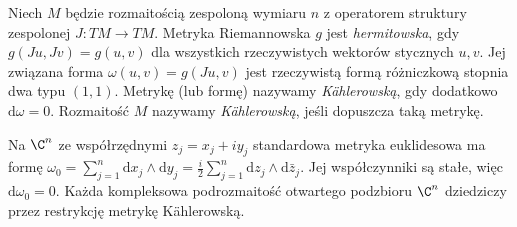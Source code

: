 \begin{definicja}
Niech $M$ będzie rozmaitością zespoloną wymiaru $n$
z operatorem struktury zespolonej $J:TM\to TM$.
Metryka Riemannowska $g$ jest \emph{hermitowska}, gdy
$g(Ju,Jv)=g(u,v)$ dla wszystkich rzeczywistych
wektorów stycznych $u,v$. Jej związana forma
$\omega(u,v)=g(Ju,v)$ jest rzeczywistą formą różniczkową
stopnia dwa typu $(1,1)$. Metrykę (lub formę)
nazywamy \emph{Kählerowską}, gdy dodatkowo
$\mathrm d\omega=0$. Rozmaitość $M$ nazywamy
\emph{Kählerowską}, jeśli dopuszcza taką metrykę.
\end{definicja}

\begin{przyklad}
Na $\C^n$ ze współrzędnymi $z_j=x_j+iy_j$
standardowa metryka euklidesowa ma formę
$\omega_0=\sum_{j=1}^n\mathrm dx_j\wedge\mathrm dy_j
=\frac{i}{2}\sum_{j=1}^n\mathrm dz_j\wedge\mathrm d\bar z_j$.
Jej współczynniki są stałe, więc $\mathrm d\omega_0=0$.
Każda kompleksowa podrozmaitość otwartego podzbioru
$\C^n$ dziedziczy przez restrykcję metrykę Kählerowską.
\end{przyklad}

